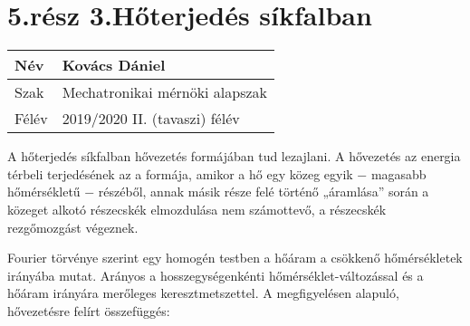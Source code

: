 \section*{5.rész 3.Hőterjedés síkfalban}


\begin{tabular}{ | p{2cm} | p{14cm} | } 
	\hline
	Név & Kovács Dániel \\ 
	\hline
	Szak &  Mechatronikai mérnöki alapszak\\
	\hline
	Félév & 2019/2020 II. (tavaszi) félév \\ 
	\hline
\end{tabular}
\vspace{0.5cm}

A hőterjedés síkfalban hővezetés formájában tud lezajlani. A hővezetés az energia térbeli terjedésének az a formája, amikor a hő egy közeg egyik − magasabb hőmérsékletű − részéből, annak másik része felé történő „áramlása” során a közeget alkotó részecskék elmozdulása nem számottevő, a részecskék rezgőmozgást végeznek.

Fourier törvénye szerint egy homogén testben a hőáram a csökkenő hőmérsékletek irányába mutat. Arányos a  hosszegységenkénti hőmérséklet-változással és a hőáram irányára merőleges keresztmetszettel. A megfigyelésen alapuló, hővezetésre felírt összefüggés:

